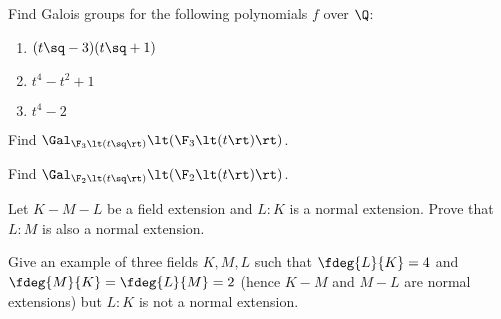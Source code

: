 \documentclass{article}
\begin{document}
\setcounter{section}{6} %
\begin{exercise}
Find Galois groups for the following polynomials $ f $ over $ \Q $:
\end{exercise}
\begin{enumerate}
  \item $ (t\sq-3)(t\sq+1) $
    \begin{solution}

    \end{solution}

  \item $ t^4-t^2+1 $
    \begin{solution}

    \end{solution}

  \item $ t^4-2 $
    \begin{solution}

    \end{solution}
\end{enumerate}
\begin{subexercise}
  Find $ \Gal_{\F_3\lt(t\sq\rt)}\lt(\F_3\lt(t\rt)\rt) $.
\end{subexercise}
\begin{solution}

\end{solution}

\begin{subexercise}
  Find $ \Gal_{\F_2\lt(t\sq\rt)}\lt(\F_2\lt(t\rt)\rt) $.
\end{subexercise}
\begin{solution}

\end{solution}

\begin{subexercise}
  Let $K - M - L$ be a field extension and $ L:K $ is a normal extension.
  Prove that $L:M$ is also a normal extension.
\end{subexercise}
\begin{solution}

\end{solution}

\begin{subexercise}
  Give an example of three fields $K, M, L$ such that $\fdeg{L}{K} = 4$ and $ \fdeg{M}{K} = \fdeg{L}{M} = 2 $ (hence $ K-M $ and $ M-L $ are normal extensions) but $L : K$ is not a normal extension.
\end{subexercise}
\begin{solution}

\end{solution}
\end{document}
